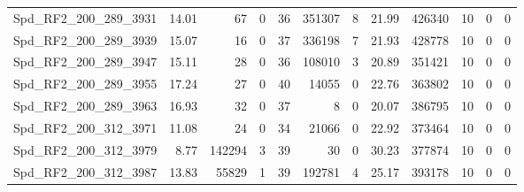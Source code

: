 \begin{longtable}[c]{@{}lrrrrrrrrrrr@{}}
Spd\_RF2\_200\_289\_3931      & 14.01                  & 67                      & 0                       & 36                     & 351307                  & 8                       & 21.99                   & 426340                   & 10                       & 0                        & 0                        \\
Spd\_RF2\_200\_289\_3939      & 15.07                  & 16                      & 0                       & 37                     & 336198                  & 7                       & 21.93                   & 428778                   & 10                       & 0                        & 0                        \\
Spd\_RF2\_200\_289\_3947      & 15.11                  & 28                      & 0                       & 36                     & 108010                  & 3                       & 20.89                   & 351421                   & 10                       & 0                        & 0                        \\
Spd\_RF2\_200\_289\_3955      & 17.24                  & 27                      & 0                       & 40                     & 14055                   & 0                       & 22.76                   & 363802                   & 10                       & 0                        & 0                        \\
Spd\_RF2\_200\_289\_3963      & 16.93                  & 32                      & 0                       & 37                     & 8                       & 0                       & 20.07                   & 386795                   & 10                       & 0                        & 0                        \\
Spd\_RF2\_200\_312\_3971      & 11.08                  & 24                      & 0                       & 34                     & 21066                   & 0                       & 22.92                   & 373464                   & 10                       & 0                        & 0                        \\
Spd\_RF2\_200\_312\_3979      & 8.77                   & 142294                  & 3                       & 39                     & 30                      & 0                       & 30.23                   & 377874                   & 10                       & 0                        & 0                        \\
Spd\_RF2\_200\_312\_3987      & 13.83                  & 55829                   & 1                       & 39                     & 192781                  & 4                       & 25.17                   & 393178                   & 10                       & 0                        & 0                        \\

\end{longtable}

